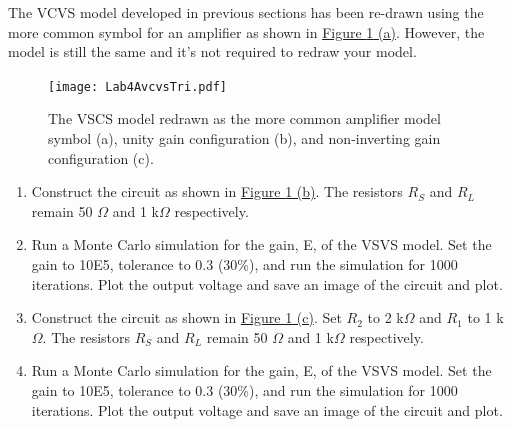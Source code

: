 The VCVS model developed in previous sections has been re-drawn using the more common symbol for an amplifier as shown in \hyperref[fig:4feedbackcombo]{Figure \ref*{fig:4feedbackcombo} (a)}. However, the model is still the same and it's not required to redraw your model. 

\begin{figure} [h]
	\centering
		\texttt{[image: Lab4AvcvsTri.pdf]}
	\caption{The VSCS model redrawn as the more common amplifier model symbol (a), unity gain configuration (b), and non-inverting gain configuration (c).} \label{fig:4feedbackcombo}
\end{figure}

\begin{enumerate}
	\item Construct the circuit as shown in \hyperref[fig:4feedbackcombo]{Figure \ref*{fig:4feedbackcombo} (b)}. The resistors $R_S$ and $R_L$ remain 50 $\Omega$ and 1 k$\Omega$ respectively. 
	\item Run a Monte Carlo simulation for the gain, E, of the VSVS model. Set the gain to 10E5, tolerance to 0.3 (30\%), and run the simulation for 1000 iterations. Plot the output voltage and save an image of the circuit and plot. \label{itm:4ssec3itm3}
	\item Construct the circuit as shown in \hyperref[fig:4feedbackcombo]{Figure \ref*{fig:4feedbackcombo} (c)}. Set $R_2$ to 2 k$\Omega$ and $R_1$ to 1 k$\Omega$. The resistors $R_S$ and $R_L$ remain 50 $\Omega$ and 1 k$\Omega$ respectively. 
	\item Run a Monte Carlo simulation for the gain, E, of the VSVS model. Set the gain to 10E5, tolerance to 0.3 (30\%), and run the simulation for 1000 iterations. Plot the output voltage and save an image of the circuit and plot. \label{itm:4ssec3itm6}
\end{enumerate} 

